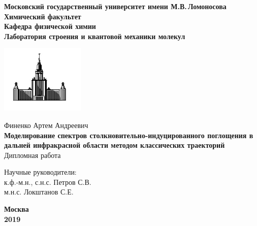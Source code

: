 \begin{titlepage}
\centering
\textbf{\large Московский государственный университет имени М.В.\,Ломоносова\\
\vspace*{0.1cm} Химический факультет\\
\vspace*{0.1cm}
\noindent\makebox[\linewidth]{\rule{\paperwidth}{0.4pt}}
\vspace*{0.1cm}
 Кафедра физической химии\\
\vspace*{0.1cm} Лаборатория строения и квантовой механики молекул \\}

\begin{center}
\includegraphics[width=0.3\textwidth]{pictures/logo.jpg}
\end{center}

\Large Финенко Артем Андреевич \\
\vspace{1cm}
\Large \textbf{Моделирование спектров столкновительно-индуцированного поглощения в дальней инфракрасной области методом классических траекторий} \\
\vspace{2cm}
\Large Дипломная работа
\vspace*{2cm}

\begin{flushright}
Научные руководители:\\
к.ф.-м.н., с.н.с. Петров С.В. \\
м.н.с. Локштанов С.Е. \\
\end{flushright}
\vfill
\large\textbf{Москва\\ 2019}
\end{titlepage}


